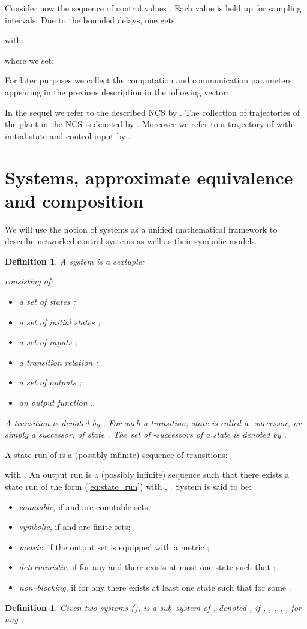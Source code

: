 \documentclass{amsart}
\newtheorem{definition}[theorem]{Definition}
\begin{document}
Consider now the sequence of control values . Each value is held up for  sampling intervals. Due to the bounded delays, one gets:

with:

where we set: 

For later purposes we collect the computation and communication parameters appearing in the previous description in the following vector:

In the sequel we refer to the described NCS by . The collection of trajectories of the plant  in the NCS  is denoted by . Moreover we refer to a trajectory of  with initial state  and control input  by .

\section{Systems, approximate equivalence and composition}\label{subsec:ApproxEquiv}
We will use the notion of systems as a unified mathematical framework to describe networked control systems as well as their symbolic models.

\begin{definition}
\cite{paulo} 
A system  is a sextuple: 

consisting of: 

\begin{itemize}
\item a set of states ;
\item a set of initial states ;
\item a set of inputs ;
\item a transition relation ;
\item a set of outputs ;
\item an output function . 
\end{itemize}
A transition  is denoted by . For such a transition, state  is called a -successor, or simply a successor, of state . The set of -successors of a state  is denoted by .
\end{definition}

A state run of  is a (possibly infinite) sequence of transitions:

with . An output run is a (possibly infinite) sequence  such that there exists a state run of the form (\ref{eq:state_run}) with , . 
System  is said to be:
\begin{itemize}
\item \textit{countable}, if  and  are countable sets;
\item \textit{symbolic}, if  and  are finite sets;
\item \textit{metric}, if the output set  is equipped with a metric ;
\item \textit{deterministic}, if for any  and  there exists at most one state  such that ;
\item \textit{non--blocking}, if for any  there exists at least one state  such that  for some .
\end{itemize}
\begin{definition}
Given two systems   (),  is a \textit{sub--system} of , denoted , if , , , , ,  for any .
\end{definition}
\end{document}
